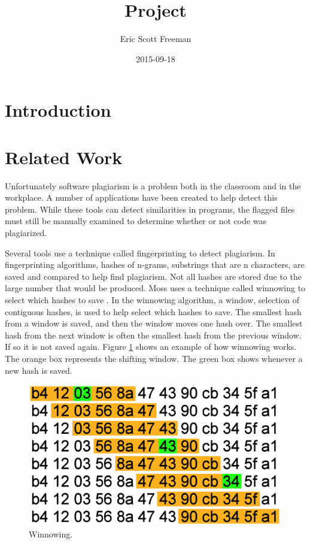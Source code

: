 \documentclass[12pt]{article}
\title{Project}
\date{2015-09-18}
\author{Eric Scott Freeman}
\begin{document}
	\maketitle
	\newpage
	\tableofcontents
	\newpage
	\section{Introduction}
		
	\section{Related Work}
		Unfortunately software plagiarism is a problem both in the classroom and in the workplace. A number of applications have been created to help detect this problem. While these tools can detect similarities in programs, the flagged files must still be manually examined to determine whether or not code was plagiarized.
	
		Several tools use a technique called fingerprinting to detect plagiarism. In fingerprinting algorithms, hashes of n-grams, substrings that are n characters, are saved and compared to help find plagiarism. Not all hashes are stored due to the large number that would be produced. Moss uses a technique called winnowing to select which hashes to save \cite{schleimer+wilkerson+aiken}. In the winnowing algorithm, a window, selection of contiguous hashes, is used to help select which hashes to save. The smallest hash from a window is saved, and then the window moves one hash over. The smallest hash from the next window is often the smallest hash from the previous window. If so it is not saved again. Figure \ref{fig:winnowing1} shows an example of how winnowing works. The orange box represents the shifting window. The green box shows whenever a new hash is saved.
		
		\begin{figure}[h!]
			\includegraphics[scale=0.75]{Winnowing.png}
			\caption{Winnowing.}
			\label{fig:winnowing1}
		\end{figure}
		
\end{document}
